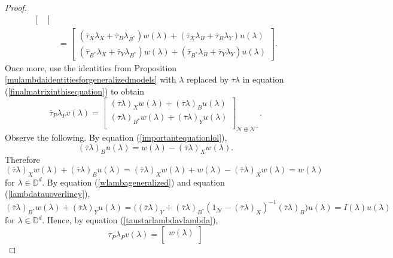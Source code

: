 \documentclass[11pt, reqno]{amsart}
\newcommand\1{\boldsymbol {1}}
\numberwithin{equation}{section}
\begin{document}
\begin{proof}
\begin{align}
\begin{bmatrix}
                                            \end{bmatrix}\nonumber\\
                                        &=\begin{bmatrix}(\overline{\tau}_{X}\lambda_{X}+\overline{\tau}_{B}\lambda_{B^{*}})w(\lambda)+(\overline{\tau}_{X}\lambda_{B}+\overline{\tau}_{B}\lambda_{Y})u(\lambda)\\(\overline{\tau}_{B^{*}}\lambda_{X}+\overline{\tau}_{Y}\lambda_{B^{*}})w(\lambda)+(\overline{\tau}_{B^{*}}\lambda_{B}+\overline{\tau}_{Y}\lambda_{Y})u(\lambda)\label{finalmatrixinthisequation}                                        \end{bmatrix}.
\end{align}
Once more, use the identities from Proposition \ref{mulambdaidentitiesforgeneralizedmodels} with $\lambda$
replaced by $\overline{\tau}\lambda$ in equation (\ref{finalmatrixinthisequation}) to obtain
\begin{equation}\label{taustarlambdavlambda}
\overline{\tau}_{P}\lambda_{P}v(\lambda)=\begin{bmatrix}
        (\overline{\tau}\lambda)_{X}w(\lambda)+(\overline{\tau}\lambda)_{B}u(\lambda)\\
        (\overline{\tau}\lambda)_{B^{*}}w(\lambda)+(\overline{\tau}\lambda)_{Y}u(\lambda) \\
\end{bmatrix}_{\mathcal{N}\oplus{\mathcal{N}^{\perp}}}.
\end{equation}
Observe the following. By equation (\ref{importantequationlol}), 
$$(\overline{\tau}\lambda)_{B}u(\lambda)=w(\lambda)-(\overline{\tau}\lambda)_{X}w(\lambda).$$
Therefore
$$(\overline{\tau}\lambda)_{X}w(\lambda)+(\overline{\tau}\lambda)_{B}u(\lambda)=(\overline{\tau}\lambda)_{X}w(\lambda)+w(\lambda)-(\overline{\tau}\lambda)_{X}w(\lambda)=w(\lambda)$$
for $\lambda\in\mathbb{D}^{d}$. By equation (\ref{wlambageneralized}) and equation (\ref{lambdatauoverliney}), 
$$(\overline{\tau}\lambda)_{B^{*}}w(\lambda)+(\overline{\tau}\lambda)_{Y}u(\lambda) = \Big((\overline{\tau}\lambda)_{Y}+(\overline{\tau}\lambda)_{B^{*}}(1_{\mathcal{N}}-(\overline{\tau}\lambda)_{X})^{-1}(\overline{\tau}\lambda)_{B}\Big)u(\lambda)=I(\lambda)u(\lambda)$$
for $\lambda\in\mathbb{D}^{d}$. Hence, by equation (\ref{taustarlambdavlambda}),
\begin{equation}\label{importantforthegeneralizedmodel}
\overline{\tau}_{P}\lambda_{P}v(\lambda) =\begin{bmatrix}
w(\lambda) \\

\end{bmatrix}
\end{equation}
\end{proof}
\end{document}

